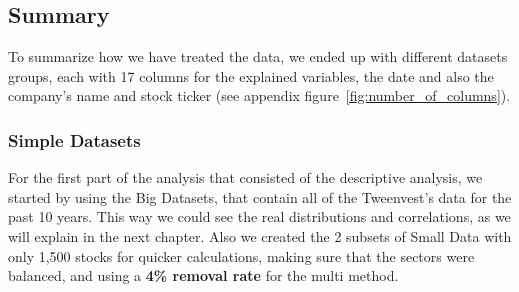 \documentclass[11pt,english,a4paper,hidelinks]{book}
\begin{document}



\subsection{Summary}

\noindent To summarize how we have treated the data, we ended up with different datasets groups, each with 17 columns for the explained variables, the date and also the company's name and stock ticker (see appendix figure~\ref{fig:number_of_columns}).

\subsubsection{Simple Datasets}
\noindent For the first part of the analysis that consisted of the descriptive analysis, we started by using the Big Datasets, that contain all of the Tweenvest's data for the past 10 years. This way we could see the real distributions and correlations, as we will explain in the next chapter. Also we created the 2 subsets of Small Data with only 1,500 stocks for quicker calculations, making sure that the sectors were balanced, and using a \textbf{4\% removal rate} for the \acrshort{multi} method.
\end{document}
